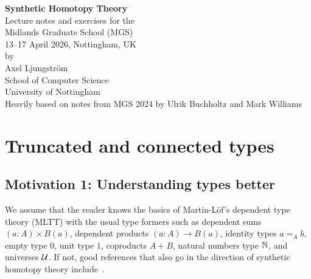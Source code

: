 \documentclass[10pt,oneside,leqno,openright]{memoir}
\begin{document}
\frontmatter
\thispagestyle{empty}
\begin{center}
  \LARGE
  {\bfseries Synthetic Homotopy Theory}\\[1cm]
  \large Lecture notes and exercises for the\\[5mm]
  \Large Midlands Graduate School (MGS)\\
  \large 13--17 April 2026, Nottingham, UK\\[1cm]
  by\\
  Axel Ljungström\\
  School of Computer Science\\
  University of Nottingham\\[1cm]
  Heavily based on notes from MGS 2024 by
  Ulrik Buchholtz and Mark Williams\\
\end{center}

\vfill


\clearpage

\tableofcontents*

\mainmatter



\chapter{Truncated and connected types}

\section{Motivation 1: Understanding types better}

We assume that the reader knows the basics of Martin-Löf's dependent type theory
(MLTT) with the usual type formers such as dependent sums $(a : A) \times B(a)$,
dependent products $(a : A) \to B(a)$, identity types $a=_Ab$, empty type $0$,
unit type $1$, coproducts $A+B$, natural numbers type $\mathbb{N}$, and universes
$\mathcal{U}$. If not, good references that also go in the direction of synthetic
homotopy theory include~\textcite{Rijke2022,hottbook}.
\end{document}
